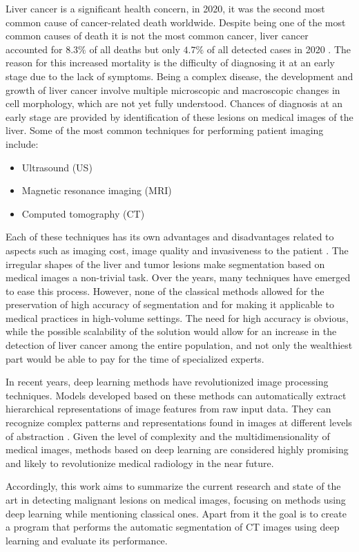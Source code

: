 Liver cancer is a significant health concern, in 2020, it was the second most common cause of cancer-related death worldwide. Despite being one of the most common causes of death it is not the most common cancer, liver cancer accounted for $8.3\%$ of all deaths but only $4.7\%$ of all detected cases in 2020 \cite{sung_global_2021}. The reason for this increased mortality is the difficulty of diagnosing it at an early stage due to the lack of symptoms. Being a complex disease, the development and growth of liver cancer involve multiple microscopic and macroscopic changes in cell morphology, which are not yet fully understood. Chances of diagnosis at an early stage are provided by identification of these lesions on medical images of the liver. Some of the most common techniques for performing patient imaging include:
\begin{itemize}
    \item Ultrasound (US)
    \item Magnetic resonance imaging (MRI)
    \item Computed tomography (CT)
\end{itemize}

Each of these techniques has its own advantages and disadvantages related to aspects such as imaging cost, image quality and invasiveness to the patient \cite{li_application_2020}. The irregular shapes of the liver and tumor lesions make segmentation based on medical images a non-trivial task. Over the years, many techniques have emerged to ease this process. However, none of the classical methods allowed for the preservation of high accuracy of segmentation and for making it applicable to medical practices in high-volume settings. The need for high accuracy is obvious, while the possible scalability of the solution would allow for an increase in the detection of liver cancer among the entire population, and not only the wealthiest part would be able to pay for the time of specialized experts.


 In recent years, deep learning methods have revolutionized image processing techniques. Models developed based on these methods can automatically extract hierarchical representations of image features from raw input data. They can recognize complex patterns and representations found in images at different levels of abstraction \cite{anguera_impact_2018}. Given the level of complexity and the multidimensionality of medical images, methods based on deep learning are considered highly promising and likely to revolutionize medical radiology in the near future.

Accordingly, this work aims to summarize the current research and state of the art in detecting malignant lesions on medical images, focusing on methods using deep learning while mentioning classical ones. Apart from it the goal is to create a program that performs the automatic segmentation of CT images using deep learning and evaluate its performance.


